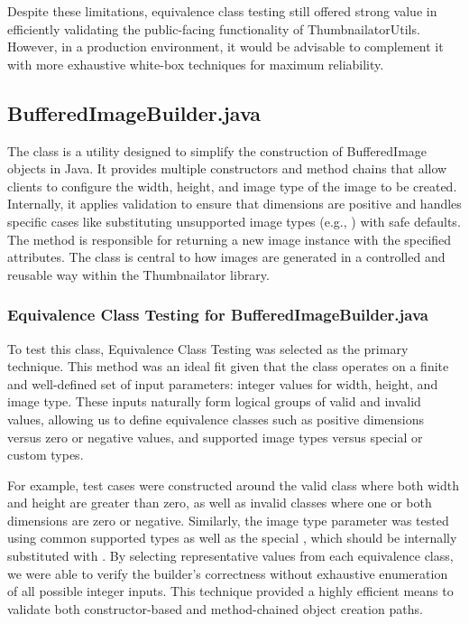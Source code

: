 \documentclass[12pt]{article}
\begin{document}
    Despite these limitations, equivalence class testing still offered strong
        value in efficiently validating the public-facing functionality of ThumbnailatorUtils. However, in a production environment, it would be advisable to complement it with more exhaustive white-box techniques for maximum reliability.

    \markboth{}{}
    \fancyhead{}
    \subsection{BufferedImageBuilder.java}
    \markboth{}{}

    The  class is a utility designed to simplify the
        construction of BufferedImage objects in Java.
    It provides multiple constructors and method chains that allow clients to
        configure the width, height, and image type of the image to be created.
    Internally, it applies validation to ensure that dimensions are positive and
        handles specific cases like substituting unsupported image types (e.g.,
        ) with safe defaults.
    The  method is responsible for returning a new image instance
        with the specified attributes.
    The class is central to how images are generated in a controlled and
        reusable way within the Thumbnailator library.

    \markboth{}{}
    \subsubsection{Equivalence Class Testing for BufferedImageBuilder.java}
    \markboth{}{}

    To test this class, Equivalence Class Testing was selected as the primary
        technique.
    This method was an ideal fit given that the class operates on a finite and
        well-defined set of input parameters: integer values for width, height,
        and image type.
    These inputs naturally form logical groups of valid and invalid values,
        allowing us to define equivalence classes such as positive dimensions
        versus zero or negative values, and supported image types versus special
        or custom types.

    For example, test cases were constructed around the valid class where both
        width and height are greater than zero, as well as invalid classes
        where one or both dimensions are zero or negative.
    Similarly, the image type parameter was tested using common supported types
        as well as the special , which should be internally
        substituted with .
    By selecting representative values from each equivalence class, we were able
        to verify the builder's correctness without exhaustive enumeration of
        all possible integer inputs.
    This technique provided a highly efficient means to validate both
        constructor-based and method-chained object creation paths.
\end{document}
